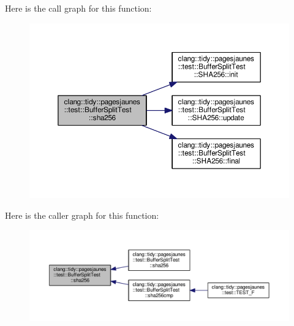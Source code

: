 Here is the call graph for this function\+:
\nopagebreak
\begin{figure}[H]
\begin{center}
\leavevmode
\includegraphics[width=350pt]{classclang_1_1tidy_1_1pagesjaunes_1_1test_1_1_buffer_split_test_ac6c4f0d179b494fb744b0b5df0db508d_cgraph}
\end{center}
\end{figure}
Here is the caller graph for this function\+:
\nopagebreak
\begin{figure}[H]
\begin{center}
\leavevmode
\includegraphics[width=350pt]{classclang_1_1tidy_1_1pagesjaunes_1_1test_1_1_buffer_split_test_ac6c4f0d179b494fb744b0b5df0db508d_icgraph}
\end{center}
\end{figure}
\mbox{\label{classclang_1_1tidy_1_1pagesjaunes_1_1test_1_1_buffer_split_test_a6b7813358946f66b4ea5f149651c6e44}} 
